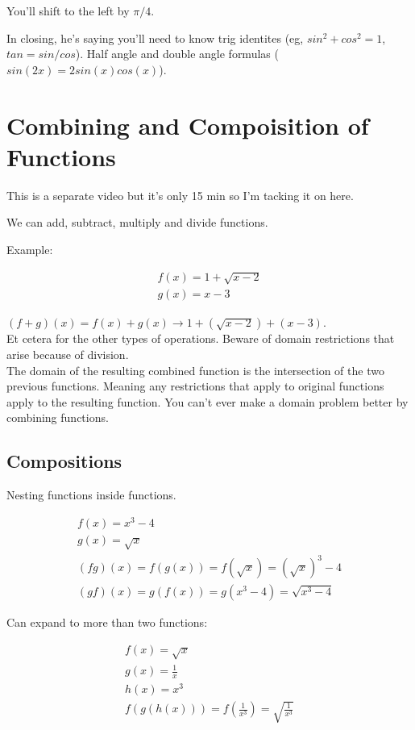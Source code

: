 \documentclass{article}
\begin{document}
You'll shift to the left by $\pi/4$.


In closing, he's saying you'll need to know trig identites (eg, $sin^2 + cos^2 = 1$, $tan
= sin/cos$). Half angle and double angle formulas ($sin(2x) = 2sin(x)cos(x)$). 

\section{Combining and Compoisition of Functions}

This is a separate video but it's only 15 min so I'm tacking it on here.

We can add, subtract, multiply and divide functions.

Example:

\begin{align*}
    f(x) = 1 + \sqrt{x - 2}\\
    g(x) = x - 3
\end{align*}

$(f + g)(x) = f(x) + g(x) \rightarrow 1 + (\sqrt{x - 2}) + (x - 3)$. \\

Et cetera for the other types of operations. Beware of domain restrictions that arise
because of division. \\

The domain of the resulting combined function is the intersection of the two previous
functions. Meaning any restrictions that apply to original functions apply to the
resulting function. You can't ever make a domain problem better by combining functions.

\subsection{Compositions}

Nesting functions inside functions.

\begin{align*}
    f(x) = x^3 - 4\\
    g(x) = \sqrt{x}\\
    (fg)(x) = f(g(x)) = f(\sqrt{x}) = (\sqrt{x})^3 - 4\\
    (gf)(x) = g(f(x)) = g(x^3 - 4) = \sqrt{x^3 - 4}
\end{align*}

Can expand to more than two functions:

\begin{align*}
    f(x) = \sqrt{x}\\
    g(x) = \frac{1}{x}\\
    h(x) = x^3\\
    f(g(h(x))) = f(\frac{1}{x^3}) = \sqrt{\frac{1}{x^3}}
\end{align*}
\end{document}
